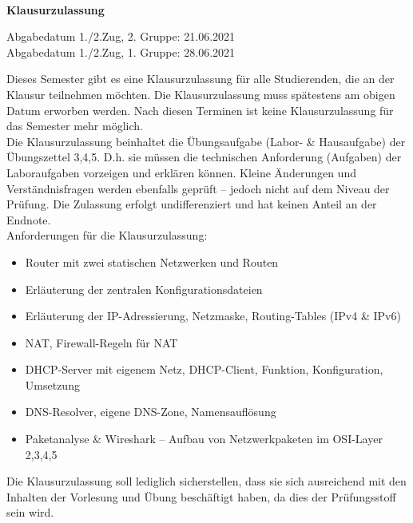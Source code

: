 \documentclass[paper=a4,fontsize=11pt]{scrartcl}%
\begin{document}
\begin{center}~\\
\Large{\textbf{Klausurzulassung}}
\end{center}
\begin{center}\Large{Abgabedatum 1./2.Zug, 2. Gruppe: 21.06.2021\\
Abgabedatum 1./2.Zug, 1. Gruppe: 28.06.2021}
\end{center}
Dieses Semester gibt es eine Klausurzulassung für alle Studierenden, die an der Klausur teilnehmen möchten. Die Klausurzulassung muss spätestens am obigen Datum erworben werden. Nach diesen Terminen ist keine Klausurzulassung für das Semester mehr möglich.\\

Die Klausurzulassung beinhaltet die Übungsaufgabe (Labor- \& Hausaufgabe) der Übungszettel 3,4,5. D.h. sie müssen die technischen Anforderung (Aufgaben) der Laboraufgaben vorzeigen und erklären können. Kleine Änderungen und Verständnisfragen werden ebenfalls geprüft -- jedoch nicht auf dem Niveau der Prüfung. Die Zulassung erfolgt undifferenziert und hat keinen Anteil an der Endnote.\\

Anforderungen für die Klausurzulassung:
\begin{itemize}
	\item Router mit zwei statischen Netzwerken und Routen
	\item Erläuterung der zentralen Konfigurationsdateien
	\item Erläuterung der IP-Adressierung, Netzmaske, Routing-Tables (IPv4 \& IPv6)
	\item NAT, Firewall-Regeln für NAT
	\item DHCP-Server mit eigenem Netz, DHCP-Client, Funktion, Konfiguration, Umsetzung
	\item DNS-Resolver, eigene DNS-Zone, Namensauflösung
	\item Paketanalyse \& Wireshark -- Aufbau von Netzwerkpaketen im OSI-Layer 2,3,4,5
\end{itemize}

Die Klausurzulassung soll lediglich sicherstellen, dass sie sich ausreichend mit den Inhalten der Vorlesung und Übung beschäftigt haben, da dies der Prüfungsstoff sein wird.
\end{document}
